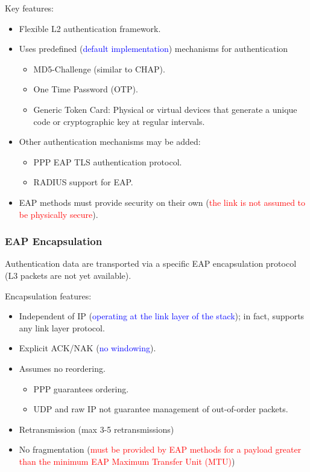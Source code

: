 Key features:
\begin{itemize}
    \item Flexible L2 authentication framework.
    \item Uses predefined (\textcolor{blue}{default implementation}) mechanisms for authentication
    \begin{itemize}
        \item MD5-Challenge (similar to CHAP).
        \item One Time Password (OTP).
        \item Generic Token Card: Physical or virtual devices that generate a unique code or cryptographic key at regular intervals.
    \end{itemize}
    \item Other authentication mechanisms may be added: 
    \begin{itemize}
        \item PPP EAP TLS authentication protocol.
        \item RADIUS support for EAP.
    \end{itemize}
    \item EAP methods must provide security on their own (\textcolor{red}{the link is not assumed to be physically secure}).
\end{itemize}

\subsubsection{EAP Encapsulation}

Authentication data are transported via a specific EAP encapsulation protocol (L3 packets are not yet available).

Encapsulation features:
\begin{itemize}
    \item Independent of IP (\textcolor{Blue}{operating at the link layer of the stack}); in fact, supports any link layer protocol.
    \item Explicit ACK/NAK (\textcolor{Blue}{no windowing}).
    \item Assumes no reordering.
    \begin{itemize}
        \item PPP guarantees ordering.
        \item UDP and raw IP not guarantee management of out-of-order packets.
    \end{itemize}
    \item Retransmission (max 3-5 retransmissions)
    \item No fragmentation (\textcolor{red}{must be provided by EAP methods for a payload greater than the minimum EAP Maximum Transfer Unit (MTU)})
\end{itemize}

